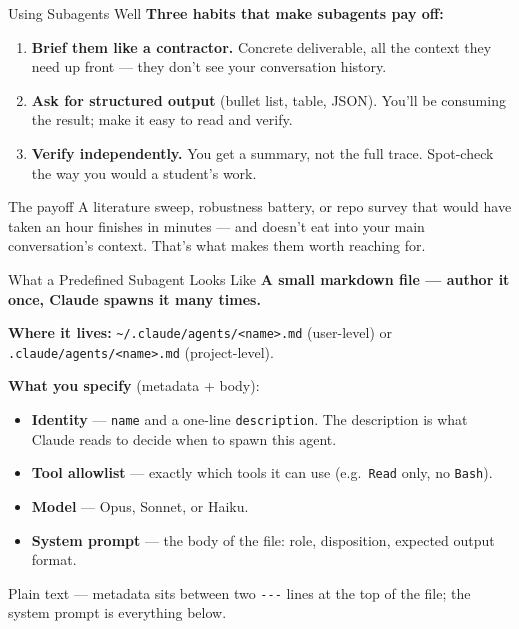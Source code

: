 \documentclass[aspectratio=169, 11pt]{beamer}
\begin{document}
\begin{frame}{Using Subagents Well}
  \textbf{Three habits that make subagents pay off:}
  \begin{enumerate}
    \item \textbf{Brief them like a contractor.} Concrete deliverable, all the context they need up front --- they don't see your conversation history.
    \item \textbf{Ask for structured output} (bullet list, table, JSON). You'll be consuming the result; make it easy to read and verify.
    \item \textbf{Verify independently.} You get a summary, not the full trace. Spot-check the way you would a student's work.
  \end{enumerate}

  \vspace{0.8em}
  \begin{block}{The payoff}
    A literature sweep, robustness battery, or repo survey that would have taken an hour finishes in minutes --- and doesn't eat into your main conversation's context. That's what makes them worth reaching for.
  \end{block}
\end{frame}


\begin{frame}{What a Predefined Subagent Looks Like}
  \textbf{A small markdown file --- author it once, Claude spawns it many times.}

  \vspace{0.4em}
  \textbf{Where it lives:} \texttt{\textasciitilde/.claude/agents/<name>.md} (user-level) or \texttt{.claude/agents/<name>.md} (project-level).

  \vspace{0.5em}
  \textbf{What you specify} (metadata + body):
  \begin{itemize}
    \item \textbf{Identity} --- \texttt{name} and a one-line \texttt{description}. The description is what Claude reads to decide when to spawn this agent.
    \item \textbf{Tool allowlist} --- exactly which tools it can use (e.g.\ \texttt{Read} only, no \texttt{Bash}).
    \item \textbf{Model} --- Opus, Sonnet, or Haiku.
    \item \textbf{System prompt} --- the body of the file: role, disposition, expected output format.
  \end{itemize}

  \vspace{0.3em}
  \alert{\small Plain text --- metadata sits between two \texttt{-{}-{}-} lines at the top of the file; the system prompt is everything below.}
\end{frame}
\end{document}
